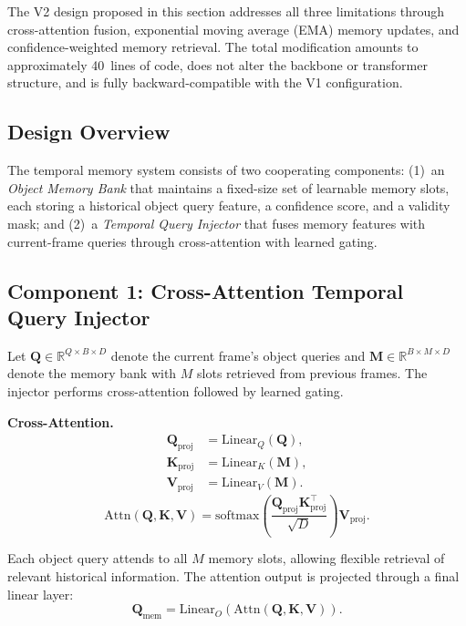 The V2 design proposed in this section addresses all three limitations through cross-attention fusion, exponential moving average (EMA) memory updates, and confidence-weighted memory retrieval. The total modification amounts to approximately 40~lines of code, does not alter the backbone or transformer structure, and is fully backward-compatible with the V1 configuration.

\subsection{Design Overview}

The temporal memory system consists of two cooperating components: (1)~an \textit{Object Memory Bank} that maintains a fixed-size set of learnable memory slots, each storing a historical object query feature, a confidence score, and a validity mask; and (2)~a \textit{Temporal Query Injector} that fuses memory features with current-frame queries through cross-attention with learned gating.

\subsection{Component 1: Cross-Attention Temporal Query Injector}

Let $\mathbf{Q} \in \mathbb{R}^{Q \times B \times D}$ denote the current frame's object queries and $\mathbf{M} \in \mathbb{R}^{B \times M \times D}$ denote the memory bank with $M$ slots retrieved from previous frames. The injector performs cross-attention followed by learned gating.

\textbf{Cross-Attention.}
\begin{equation}
\begin{aligned}
\mathbf{Q}_{\mathrm{proj}} &= \mathrm{Linear}_Q(\mathbf{Q}), \\
\mathbf{K}_{\mathrm{proj}} &= \mathrm{Linear}_K(\mathbf{M}), \\
\mathbf{V}_{\mathrm{proj}} &= \mathrm{Linear}_V(\mathbf{M}).
\end{aligned}
\end{equation}
\begin{equation}
\mathrm{Attn}(\mathbf{Q}, \mathbf{K}, \mathbf{V}) = \mathrm{softmax}\!\left(\frac{\mathbf{Q}_{\mathrm{proj}} \mathbf{K}_{\mathrm{proj}}^\top}{\sqrt{D}}\right) \mathbf{V}_{\mathrm{proj}}.
\end{equation}

Each object query attends to all $M$ memory slots, allowing flexible retrieval of relevant historical information. The attention output is projected through a final linear layer:
\begin{equation}
\mathbf{Q}_{\mathrm{mem}} = \mathrm{Linear}_O(\mathrm{Attn}(\mathbf{Q}, \mathbf{K}, \mathbf{V})).
\end{equation}

